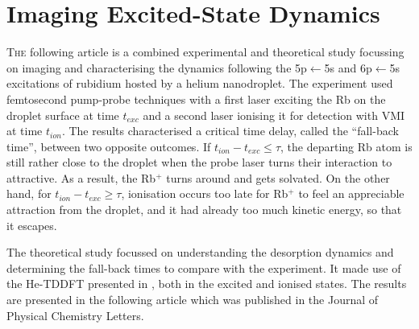 \chapter{Imaging Excited-State Dynamics}\label{ch:exc-state-dyn}
	\lettrine[lines=4]{\color{activeColor}T}{he} following article is a combined experimental and theoretical study focussing on imaging and characterising the dynamics following the 5p$\leftarrow$5s and 6p$\leftarrow$5s excitations of rubidium hosted by a helium nanodroplet. The experiment used femtosecond pump-probe techniques with a first laser exciting the Rb on the droplet surface at time $t_{exc}$ and a second laser ionising it for detection with VMI at time $t_{ion}$. The results characterised a critical time delay, called the ``fall-back time'', between two opposite outcomes. If $t_{ion}-t_{exc}\leq\tau$, the departing Rb atom is still rather close to the droplet when the probe laser turns their interaction to attractive. As a result, the Rb$^+$ turns around and gets solvated. On the other hand, for $t_{ion}-t_{exc}\geq\tau$, ionisation occurs too late for Rb$^+$ to feel an appreciable attraction from the droplet, and it had already too much kinetic energy, so that it escapes. 
	
	The theoretical study focussed on understanding the desorption dynamics and determining the fall-back times to compare with the experiment. It made use of the He-TDDFT presented in , both in the excited and ionised states. The results are presented in the following article which was published in the Journal of Physical Chemistry Letters\citep{Vangerow2017}.
	
%	
	